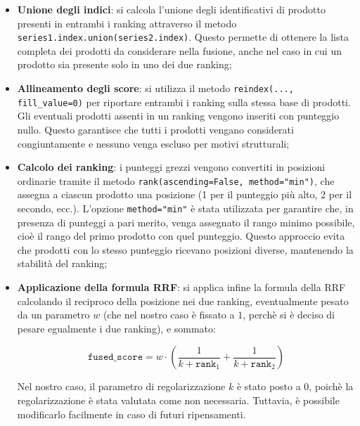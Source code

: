 \begin{itemize}
    \item \textbf{Unione degli indici}: si calcola l'unione degli identificativi di prodotto presenti in entrambi i ranking attraverso il metodo \texttt{series1.index.union(series2.index)}. Questo permette di ottenere la lista completa dei prodotti da considerare nella fusione, anche nel caso in cui un prodotto sia presente solo in uno dei due ranking;
    
    \item \textbf{Allineamento degli score}: si utilizza il metodo \texttt{reindex(..., fill\_value=0)} per riportare entrambi i ranking sulla stessa base di prodotti. Gli eventuali prodotti assenti in un ranking vengono inseriti con punteggio nullo. Questo garantisce che tutti i prodotti vengano considerati congiuntamente e nessuno venga escluso per motivi strutturali;
    
    \item \textbf{Calcolo dei ranking}: i punteggi grezzi vengono convertiti in posizioni ordinarie tramite il metodo \texttt{rank(ascending=False, method="min")}, che assegna a ciascun prodotto una posizione (1 per il punteggio più alto, 2 per il secondo, ecc.). L'opzione \texttt{method="min"} è stata utilizzata per garantire che, in presenza di punteggi a pari merito, venga assegnato il rango minimo possibile, cioè il rango del primo prodotto con quel punteggio. Questo approccio evita che prodotti con lo stesso punteggio ricevano posizioni diverse, mantenendo la stabilità del ranking;
    
    \item \textbf{Applicazione della formula RRF}: si applica infine la formula della RRF calcolando il reciproco della posizione nei due ranking, eventualmente pesato da un parametro $w$ (che nel nostro caso è fissato a $1$, perchè si è deciso di pesare egualmente i due ranking), e sommato:
    
    \begin{equation}
    \texttt{fused\_score} = w \cdot \left( \frac{1}{k + \texttt{rank}_1} + \frac{1}{k + \texttt{rank}_2} \right)
    \end{equation}
    
    Nel nostro caso, il parametro di regolarizzazione $k$ è stato posto a $0$, poichè la regolarizzazione è stata valutata come non necessaria. Tuttavia, è possibile modificarlo facilmente in caso di futuri ripensamenti.
\end{itemize}

